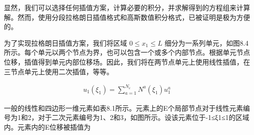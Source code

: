 \documentclass[12pt,a4paper]{book}
\begin{document}
显然，我们可以选择任何插值方案，计算必要的积分，并求解得到的方程组来计算解。然而，使用分段拉格朗日插值格式和高斯数值积分格式，已被证明是极为方便的。

为了实现拉格朗日插值方案，我们将区域 $ 0 \leq  x_1 \leq L $ 细分为一系列单元，如图8.4所示。每个单元以两个节点为界，也可以包含一个或多个内部节点。根据单元节点位移，插值得到单元内部位移场。因此，我们将在两节点单元上使用线性插值，在三节点单元上使用二次插值，等等。

\begin{equation*}
    \begin{aligned}
        u_{1}\left(\xi_{1}\right)=\sum_{a=1}^{N_{e}} N^{a}\left(\xi_{1}\right) u_{1}^{a}
    \end{aligned}
\end{equation*}


一般的线性和四边形一维元素如表8.1所示。元素上的E个局部节点对于线性元素编号为1和2，对于二次元素编号为1、2和3，如图所示。设该元素位于-1≤ξ1≤1的区域内。元素内的E位移被插值为


% 







\end{document}
